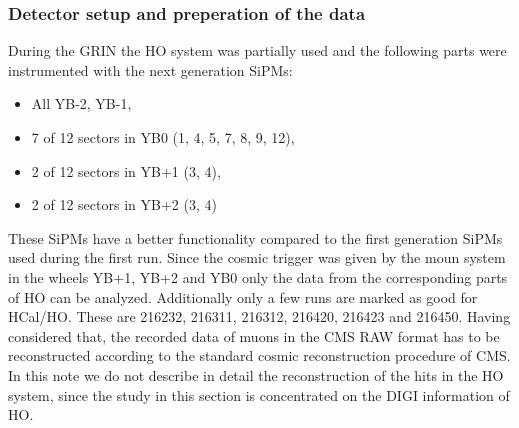 		\subsubsection{Detector setup and preperation of the data}
			During the GRIN the HO system was partially used and the following parts were instrumented with the next generation SiPMs:
			\begin{itemize}
				\item All YB-2, YB-1,
				\item 7 of 12 sectors in YB0 (1, 4, 5, 7, 8, 9, 12),
				\item 2 of 12 sectors in YB+1 (3, 4),
				\item 2 of 12 sectors in YB+2 (3, 4)
			\end{itemize}
			These SiPMs have a better functionality compared to the first generation SiPMs used during the first run.
			Since the cosmic trigger was given by the moun system in the wheels YB+1, YB+2 and YB0 only the data from the corresponding parts of HO can be analyzed.
			Additionally only a few runs are marked as good for HCal/HO.
			These are 216232, 216311, 216312, 216420, 216423 and 216450.
			Having considered that, the recorded data of muons in the CMS RAW format has to be reconstructed according to the standard cosmic reconstruction procedure of CMS.
			In this note we do not describe in detail the reconstruction of the hits in the HO system, since the study in this section is concentrated on the DIGI information of HO.
